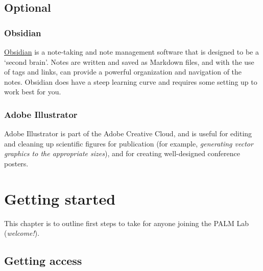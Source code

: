 \documentclass[
]{book}
\begin{document}
\hypertarget{optional}{%
\section{Optional}\label{optional}}

\hypertarget{obsidian}{%
\subsection*{Obsidian}\label{obsidian}}

\href{https://obsidian.md/}{Obsidian} is a note-taking and note management software that is designed to be a `second brain'. Notes are written and saved as Markdown files, and with the use of tags and links, can provide a powerful organization and navigation of the notes. Obsidian does have a steep learning curve and requires some setting up to work best for you.

\hypertarget{adobe-illustrator}{%
\subsection*{Adobe Illustrator}\label{adobe-illustrator}}

Adobe Illustrator is part of the Adobe Creative Cloud, and is useful for editing and cleaning up scientific figures for publication (for example, \emph{generating vector graphics to the appropriate sizes}), and for creating well-designed conference posters.

\hypertarget{getting-started}{%
\chapter{Getting started}\label{getting-started}}

This chapter is to outline first steps to take for anyone joining the PALM Lab (\emph{welcome!}).

\hypertarget{getting-access}{%
\section{Getting access}\label{getting-access}}
\end{document}
